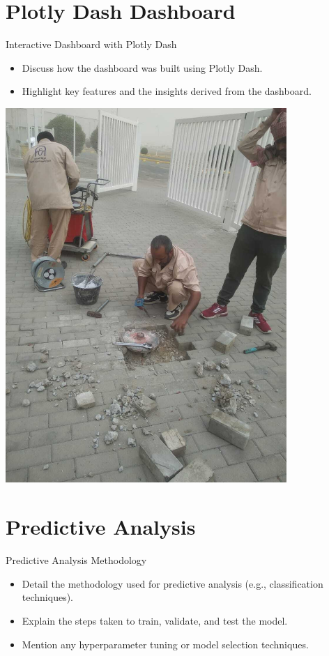 \documentclass{beamer}
\begin{document}
\section{Plotly Dash Dashboard}
\begin{frame}{Interactive Dashboard with Plotly Dash}
    \begin{itemize}
        \item Discuss how the dashboard was built using Plotly Dash.
        \item Highlight key features and the insights derived from the dashboard.
    \end{itemize}
    \includegraphics[width=0.8\textwidth]{images/plotly_dashboard.jpg}
\end{frame}

\section{Predictive Analysis}
\begin{frame}{Predictive Analysis Methodology}
    \begin{itemize}
        \item Detail the methodology used for predictive analysis (e.g., classification techniques).
        \item Explain the steps taken to train, validate, and test the model.
        \item Mention any hyperparameter tuning or model selection techniques.
    \end{itemize}
\end{frame}
\end{document}
